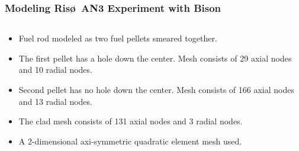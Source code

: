 \begin{frame}
\frametitle{Modeling Ris\o~AN3 Experiment with Bison}

\begin{columns}
 \begin{column}{0.7\textwidth}

\begin{itemize}
  \item Fuel rod modeled as two fuel pellets smeared together.
  \item The first pellet has a hole down the center. Mesh consists of 29 axial nodes and 10 radial nodes.
  \item Second pellet has no hole down the center. Mesh consists of 166 axial nodes and 13 radial nodes.
  \item The clad mesh consists of 131 axial nodes and 3 radial nodes. 
  \item A 2-dimensional axi-symmetric quadratic element mesh used. 
\end{itemize}


\end{column}
\end{columns}
\end{frame}
